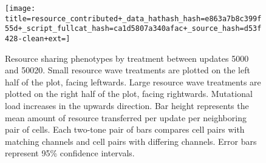\begin{figure}[!htbp]
\begin{center}

\texttt{[image: title=resource\_contributed+\_data\_hathash\_hash=e863a7b8c399f55d+\_script\_fullcat\_hash=ca1d5807a340afac+\_source\_hash=d53f428-clean+ext=]}

\caption{
Resource sharing phenotypes by treatment between updates 5000 and 50020.
Small resource wave treatments are plotted on the left half of the plot, facing leftwards.
Large resource wave treatments are plotted on the right half of the plot, facing rightwards.
Mutational load increases in the upwards direction.
Bar height represents the mean amount of resource transferred per update per neighboring pair of cells.
Each two-tone pair of bars compares cell pairs with matching channels and cell pairs with differing channels.
Error bars represent 95\% confidence intervals.
} \label{fig:resource_contributed}
\end{center}
\end{figure}
